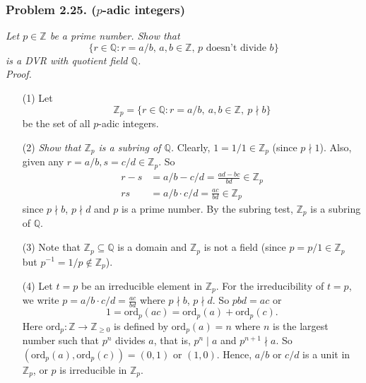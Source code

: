 \documentclass{article}
\begin{document}



\subsubsection*{Problem 2.25. ($p$-adic integers)}
\emph{Let $p \in \mathbb{Z}$ be a prime number.
Show that
\[
  \{ r \in \mathbb{Q} : \text{$r = a/b$, $a,b \in \mathbb{Z}$, $p$ doesn't divide $b$} \}
\]
is a DVR with quotient field $\mathbb{Q}$.} \\



\emph{Proof.}
\begin{enumerate}
\item[(1)]
  Let
  \[
    \mathbb{Z}_p
    = \{ r \in \mathbb{Q} : r = a/b, \: a,b \in \mathbb{Z}, \: p \nmid b \}
  \]
  be the set of all $p$-adic integers.

\item[(2)]
  \emph{Show that $\mathbb{Z}_p$ is a subring of $\mathbb{Q}$.}
  Clearly, $1 = 1/1 \in \mathbb{Z}_p$ (since $p \nmid 1$).
  Also, given any $r = a/b, s = c/d \in \mathbb{Z}_p$.
  So
  \begin{align*}
    r - s &= a/b - c/d = \frac{ad - bc}{bd} \in \mathbb{Z}_p \\
    rs &= a/b \cdot c/d = \frac{ac}{bd} \in \mathbb{Z}_p
  \end{align*}
  since $p \nmid b$, $p \nmid d$ and $p$ is a prime number.
  By the subring test, $\mathbb{Z}_p$ is a subring of $\mathbb{Q}$.

\item[(3)]
  Note that $\mathbb{Z}_p \subseteq \mathbb{Q}$ is a domain
  and $\mathbb{Z}_p$ is not a field (since $p = p/1 \in \mathbb{Z}_p$
  but $p^{-1} = 1/p \not\in \mathbb{Z}_p$).

\item[(4)]
  Let $t = p$ be an irreducible element in $\mathbb{Z}_p$.
  For the irreducibility of $t = p$, we write $p = a/b \cdot c/d = \frac{ac}{bd}$
  where $p \nmid b$, $p \nmid d$. So $pbd = ac$ or
  \[
    1 = \mathrm{ord}_p(ac) = \mathrm{ord}_p(a) + \mathrm{ord}_p(c).
  \]
  Here $\mathrm{ord}_p: \mathbb{Z} \to \mathbb{Z}_{\geq 0}$
  is defined by $\mathrm{ord}_p(a) = n$ where
  $n$ is the largest number such that $p^n$ divides $a$,
  that is, $p^n \mid a$ and $p^{n+1} \nmid a$.
  So $(\mathrm{ord}_p(a), \mathrm{ord}_p(c)) = (0,1)$ or $(1,0)$.
  Hence, $a/b$ or $c/d$ is a unit in $\mathbb{Z}_p$, or $p$ is irreducible in $\mathbb{Z}_p$.


\end{enumerate}
\end{document}
